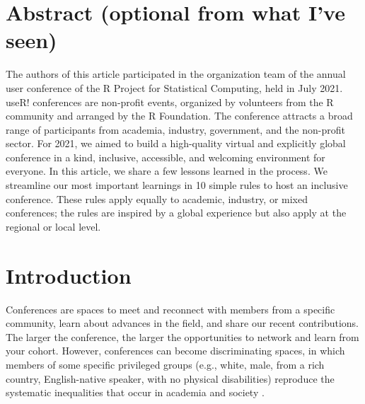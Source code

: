 \documentclass[10pt,letterpaper]{article}
\begin{document}
\section*{Abstract (optional from what I've seen)}

The authors of this article participated in the organization team of the annual user conference of the R Project for Statistical Computing, held in July 2021. useR! conferences are non-profit events, organized by volunteers from the R community and arranged by the R Foundation. The conference attracts a broad range of participants from academia, industry, government, and the non-profit sector. For 2021, we aimed to build a high-quality virtual and explicitly global conference in a kind, inclusive, accessible, and welcoming environment for everyone. 
In this article, we share a few lessons learned in the process. We streamline our most important learnings in 10 simple rules to host an inclusive conference. These rules apply equally to academic, industry, or mixed conferences; the rules are inspired by a global experience but also apply at the regional or local level.





\linenumbers

\section*{Introduction}

Conferences are spaces to meet and reconnect with members from a specific community, learn about advances in the field, and share our recent contributions. The larger the conference, the larger the opportunities to network and learn from your cohort. However, conferences can become discriminating spaces, in which members of some specific privileged groups (e.g., white, male, from a rich country, English-native speaker, with no physical disabilities) reproduce the systematic inequalities that occur in academia and society \cite{arendDisparityConferenceRegistration2019, timperleyHeMoanaPukepuke2020, gewinWhatScientistsShould2019, brownAbleismAcademiaWhere2018}.
\end{document}
